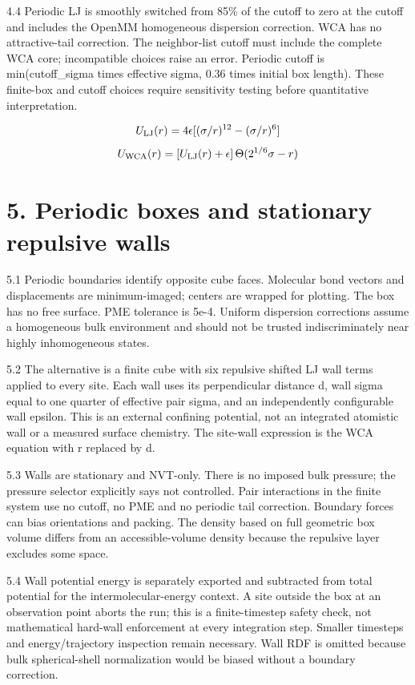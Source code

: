 \documentclass[11pt]{article}
\begin{document}
4.4 Periodic LJ is smoothly switched from 85\% of the cutoff to zero at the cutoff and includes the OpenMM homogeneous dispersion correction. WCA has no attractive-tail correction. The neighbor-list cutoff must include the complete WCA core; incompatible choices raise an error. Periodic cutoff is min(cutoff\_sigma times effective sigma, 0.36 times initial box length). These finite-box and cutoff choices require sensitivity testing before quantitative interpretation.


\[U_{\rm LJ}(r)=4\epsilon[(\sigma/r)^{12}-(\sigma/r)^6]\]
\[U_{\rm WCA}(r)=[U_{\rm LJ}(r)+\epsilon]\,\Theta(2^{1/6}\sigma-r)\]
\section*{5. Periodic boxes and stationary repulsive walls}
5.1 Periodic boundaries identify opposite cube faces. Molecular bond vectors and displacements are minimum-imaged; centers are wrapped for plotting. The box has no free surface. PME tolerance is 5e-4. Uniform dispersion corrections assume a homogeneous bulk environment and should not be trusted indiscriminately near highly inhomogeneous states.


5.2 The alternative is a finite cube with six repulsive shifted LJ wall terms applied to every site. Each wall uses its perpendicular distance d, wall sigma equal to one quarter of effective pair sigma, and an independently configurable wall epsilon. This is an external confining potential, not an integrated atomistic wall or a measured surface chemistry. The site-wall expression is the WCA equation with r replaced by d.


5.3 Walls are stationary and NVT-only. There is no imposed bulk pressure; the pressure selector explicitly says not controlled. Pair interactions in the finite system use no cutoff, no PME and no periodic tail correction. Boundary forces can bias orientations and packing. The density based on full geometric box volume differs from an accessible-volume density because the repulsive layer excludes some space.


5.4 Wall potential energy is separately exported and subtracted from total potential for the intermolecular-energy context. A site outside the box at an observation point aborts the run; this is a finite-timestep safety check, not mathematical hard-wall enforcement at every integration step. Smaller timesteps and energy/trajectory inspection remain necessary. Wall RDF is omitted because bulk spherical-shell normalization would be biased without a boundary correction.
\end{document}
